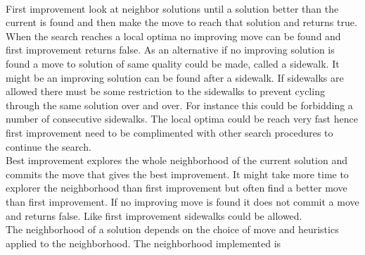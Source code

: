 \DecMargin{1em} \\
First improvement look at neighbor solutions until a solution better than the current is found  and then make the move to reach that solution and returns true. When the search reaches a local optima no 
improving move can be found and first improvement returns false. As an alternative if no 
improving solution is found a move to solution of same quality could be made, called a sidewalk. It might be an 
improving solution can be found after a sidewalk. If sidewalks are allowed there must be some restriction to the 
sidewalks to prevent cycling through the same solution over and over. For instance this could be forbidding a number of 
consecutive sidewalks. The local optima could be reach very fast hence first improvement need to be complimented with 
other search procedures to continue the search. \\ 
Best improvement explores the whole neighborhood of the current solution and commits the move that gives the best 
improvement. It might take more time to explorer the neighborhood than first improvement but often find a 
better move than first improvement. If no improving move is found it does not commit a move and returns false. Like 
first improvement sidewalks could be allowed. \\ 
The neighborhood of a solution depends on the choice of move and heuristics applied to the neighborhood. The 
neighborhood implemented is  
